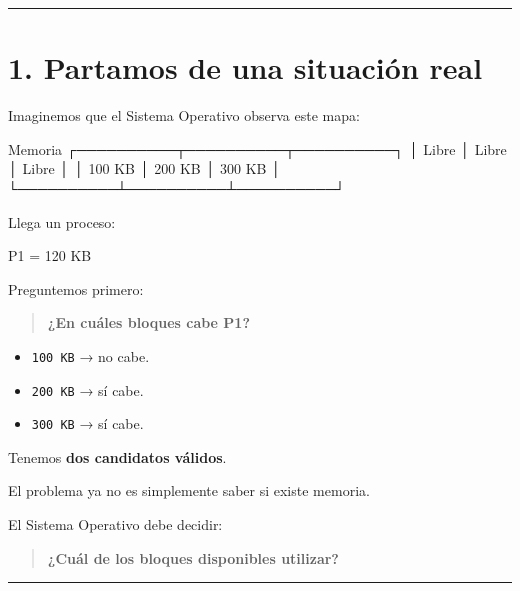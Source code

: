 \documentclass[
  spanish,
  letterpaper,
]{scrbook}
\newenvironment{Shaded}{\begin{snugshade}}{\end{snugshade}}
\newcommand{\NormalTok}[1]{\textcolor[rgb]{0.00,0.23,0.31}{#1}}
\providecommand{\tightlist}{%
  \setlength{\itemsep}{0pt}\setlength{\parskip}{0pt}}
\begin{document}
\begin{center}\rule{0.5\linewidth}{0.5pt}\end{center}


\chapter{1. Partamos de una situación
real}\label{partamos-de-una-situaciuxf3n-real}

Imaginemos que el Sistema Operativo observa este mapa:

\begin{Shaded}
\begin{Highlighting}[]
\NormalTok{Memoria}
\NormalTok{┌──────────┬──────────┬──────────┐}
\NormalTok{│ Libre    │ Libre    │ Libre    │}
\NormalTok{│ 100 KB   │ 200 KB   │ 300 KB   │}
\NormalTok{└──────────┴──────────┴──────────┘}
\end{Highlighting}
\end{Shaded}

Llega un proceso:

\begin{Shaded}
\begin{Highlighting}[]
\NormalTok{P1 = 120 KB}
\end{Highlighting}
\end{Shaded}

Preguntemos primero:

\begin{quote}
\textbf{¿En cuáles bloques cabe P1?}
\end{quote}

\begin{itemize}
\tightlist
\item
  \texttt{100\ KB} → no cabe.
\item
  \texttt{200\ KB} → sí cabe.
\item
  \texttt{300\ KB} → sí cabe.
\end{itemize}

Tenemos \textbf{dos candidatos válidos}.

El problema ya no es simplemente saber si existe memoria.

El Sistema Operativo debe decidir:

\begin{quote}
\textbf{¿Cuál de los bloques disponibles utilizar?}
\end{quote}

\begin{center}\rule{0.5\linewidth}{0.5pt}\end{center}
\end{document}
